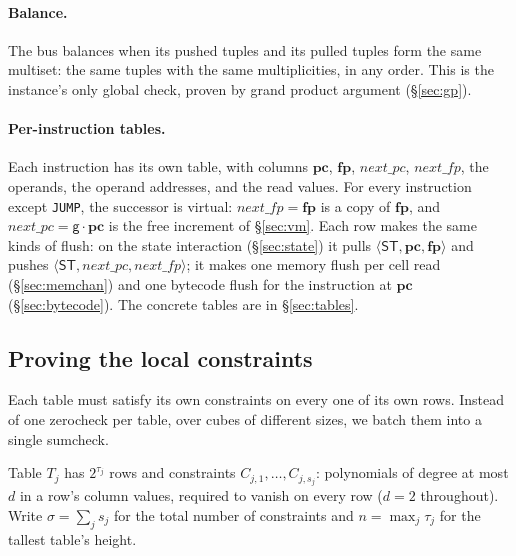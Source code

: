 \documentclass[11pt]{article}
\newcommand{\gen}{\mathsf{g}}
\newcommand{\pc}{\mathbf{pc}}
\newcommand{\fp}{\mathbf{fp}}
\newcommand{\tup}[1]{\langle #1 \rangle}
\newcommand{\dsep}[1]{\mathsf{#1}}
\begin{document}
\paragraph{Balance.} The bus balances when its pushed tuples and its pulled tuples form the same multiset: the same tuples with the same multiplicities, in any order. This is the instance's only global check, proven by grand product argument (\S\ref{sec:gp}).

\paragraph{Per-instruction tables.} Each instruction has its own table, with columns $\pc$, $\fp$, $\mathit{next\_pc}$, $\mathit{next\_fp}$, the operands, the operand addresses, and the read values. For every instruction except \texttt{JUMP}, the successor is virtual: $\mathit{next\_fp}=\fp$ is a copy of $\fp$, and $\mathit{next\_pc}=\gen\cdot\pc$ is the free increment of \S\ref{sec:vm}. Each row makes the same kinds of flush: on the state interaction (\S\ref{sec:state}) it pulls $\tup{\dsep{ST},\pc,\fp}$ and pushes $\tup{\dsep{ST},\mathit{next\_pc},\mathit{next\_fp}}$; it makes one memory flush per cell read (\S\ref{sec:memchan}) and one bytecode flush for the instruction at $\pc$ (\S\ref{sec:bytecode}). The concrete tables are in \S\ref{sec:tables}.

\subsection{Proving the local constraints}\label{sec:air}

Each table must satisfy its own constraints on every one of its own rows. Instead of one zerocheck per table, over cubes of different sizes, we batch them into a single sumcheck.

Table $T_j$ has $2^{\tau_j}$ rows and constraints $C_{j,1},\dots,C_{j,s_j}$: polynomials of degree at most $d$ in a row's column values, required to vanish on every row ($d=2$ throughout). Write $\sigma=\sum_j s_j$ for the total number of constraints and $n=\max_j\tau_j$ for the tallest table's height.
\end{document}
